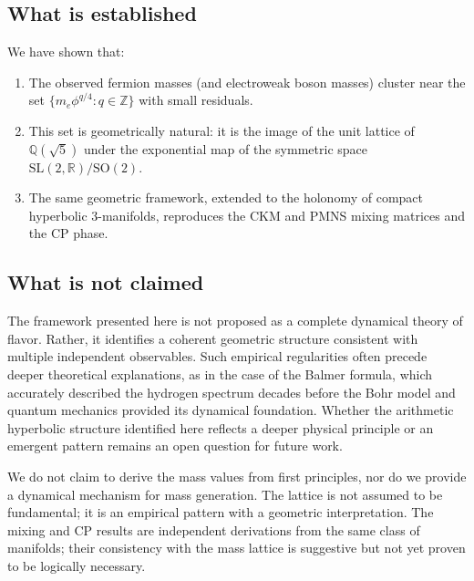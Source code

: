 \documentclass[12pt]{article}
\theoremstyle{definition}
\begin{document}
\subsection{What is established}
We have shown that:
\begin{enumerate}
\item The observed fermion masses (and electroweak boson masses) cluster near the set $\{m_e \phi^{q/4} : q\in\mathbb{Z}\}$ with small residuals.
\item This set is geometrically natural: it is the image of the unit lattice of $\mathbb{Q}(\sqrt5)$ under the exponential map of the symmetric space $\mathrm{SL}(2,\mathbb{R})/\mathrm{SO}(2)$.
\item The same geometric framework, extended to the holonomy of compact hyperbolic 3-manifolds, reproduces the CKM and PMNS mixing matrices and the CP phase.
\end{enumerate}

\subsection{What is not claimed}

The framework presented here is not proposed as a complete dynamical theory of flavor. Rather, it identifies a coherent geometric structure consistent with multiple independent observables. Such empirical regularities often precede deeper theoretical explanations, as in the case of the Balmer formula, which accurately described the hydrogen spectrum decades before the Bohr model and quantum mechanics provided its dynamical foundation. Whether the arithmetic hyperbolic structure identified here reflects a deeper physical principle or an emergent pattern remains an open question for future work.

We do not claim to derive the mass values from first principles, nor do we provide a dynamical mechanism for mass generation. The lattice is not assumed to be fundamental; it is an empirical pattern with a geometric interpretation. The mixing and CP results are independent derivations from the same class of manifolds; their consistency with the mass lattice is suggestive but not yet proven to be logically necessary.
\end{document}
